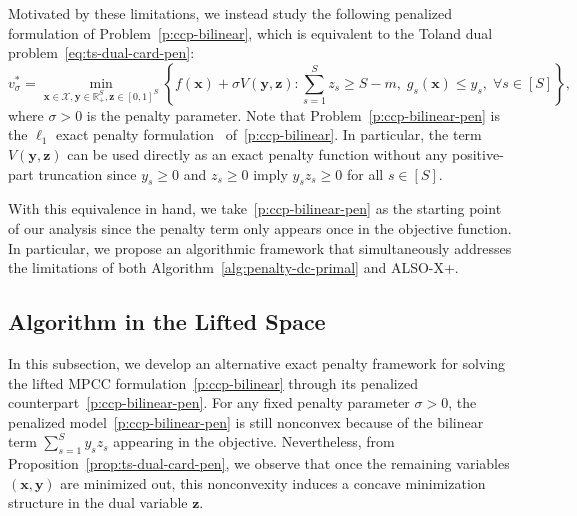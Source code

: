\documentclass[11pt]{article}
\def\bs{\boldsymbol}
\def\Re{\mathbb{R}}
\def\X{\mathcal{X}}
\begin{document}
Motivated by these limitations, we instead study the following penalized formulation of Problem~\eqref{p:ccp-bilinear}, which is equivalent to the Toland dual problem~\eqref{eq:ts-dual-card-pen}:
\begin{equation} \label{p:ccp-bilinear-pen}
v^*_\sigma = \min_{\bs{x} \in \X, \bs{y}\in\Re^S_+, \bs{z}\in[0,1]^S} \left\{ f(\bs{x}) + \sigma V(\bs{y}, \bs{z}): \sum^S_{s=1}z_s \geq S-m, \; g_s(\bs{x}) \leq y_s, \;\forall s \in [S] \right\},
\end{equation}
where $\sigma > 0$ is the penalty parameter. Note that Problem~\eqref{p:ccp-bilinear-pen} is the $\ell_1$ exact penalty formulation~\cite{han1979exact} of~\eqref{p:ccp-bilinear}. In particular, the term $V(\bs{y}, \bs{z})$ can be used directly as an exact penalty function without any positive-part truncation since $y_s\ge 0$ and $z_s\ge 0$ imply $y_s z_s \ge 0$ for all $s\in[S]$.

With this equivalence in hand, we take~\eqref{p:ccp-bilinear-pen} as the starting point of our analysis since the penalty term only appears once in the objective function. In particular, we propose an algorithmic framework that simultaneously addresses the limitations of both Algorithm~\ref{alg:penalty-dc-primal} and ALSO-X+.

\subsection{Algorithm in the Lifted Space}

In this subsection, we develop an alternative exact penalty framework for solving the lifted MPCC formulation~\eqref{p:ccp-bilinear} through its penalized counterpart~\eqref{p:ccp-bilinear-pen}. For any fixed penalty parameter $\sigma>0$, the penalized model~\eqref{p:ccp-bilinear-pen} is still nonconvex because of the bilinear term $\sum_{s=1}^S y_s z_s$ appearing in the objective. Nevertheless, from Proposition~\ref{prop:ts-dual-card-pen}, we observe that once the remaining variables $(\bs{x},\bs{y})$ are minimized out, this nonconvexity induces a concave minimization structure in the dual variable $\bs{z}$.
\end{document}
